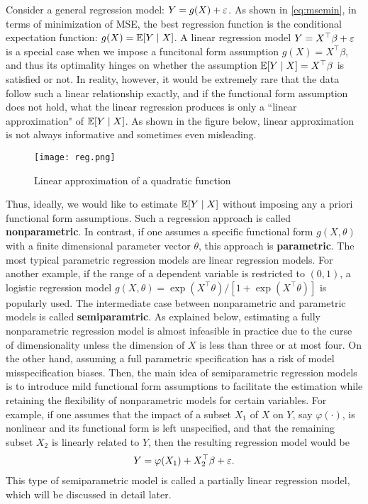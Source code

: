 \documentclass[11pt, A4paper, openany, uplatex]{book}
\begin{document}
Consider a general regression model: $Y = g(X) + \varepsilon$.
As shown in \eqref{eq:msemin}, in terms of minimization of MSE, the best regression function is the conditional expectation function: $g(X) = \mathbb{E}[Y \mid X]$.
A linear regression model $Y = X^\top\beta + \varepsilon$ is a special case when we impose a funcitonal form  assumption $g(X) = X^\top \beta$, and thus its optimality hinges on whether the assumption $\mathbb{E}[Y \mid X] = X^\top\beta$ is satisfied or not.
In reality, however, it would be extremely rare that the data follow such a linear relationship exactly, and if the functional form assumption does not hold, what the linear regression produces is only a ``linear approximation" of $\mathbb{E}[Y \mid X]$.
As shown in the figure below, linear approximation is not always informative and sometimes even misleading.

\begin{figure}[h!]
	\begin{center}
		\texttt{[image: reg.png]}
		\caption{Linear approximation of a quadratic function}
	\end{center}
\end{figure}


Thus, ideally, we would like to estimate $\mathbb{E} [Y \mid X]$ without imposing any a priori functional form assumptions.
Such a regression approach is called \textbf{nonparametric}.
In contrast, if one assumes a specific functional form $g(X, \theta)$ with a finite dimensional parameter vector $\theta$, this approach is \textbf{parametric}.
The most typical parametric regression models are linear regression models.
For another example, if the range of a dependent variable is restricted to $(0,1)$, a logistic regression model $g(X, \theta) = \exp(X^\top \theta)/[1 + \exp(X^\top \theta)]$ is popularly used. 
The intermediate case between nonparametric and parametric models is called \textbf{semiparamtric}.
As explained below, estimating a fully nonparametric regression model is almost infeasible in practice due to the curse of dimensionality unless the dimension of $X$ is less than three or at most four.
On the other hand, assuming a full parametric specification has a risk of model misspecification biases.
Then, the main idea of semiparametric regression models is to introduce mild functional form assumptions to facilitate the estimation while retaining the flexibility of nonparametric models for certain variables.
For example, if one assumes that the impact of a subset $X_1$ of $X$ on $Y$, say $\varphi(\cdot)$, is nonlinear and its functional form is left unspecified, and that the remaining subset $X_2$ is linearly related to $Y$, then the resulting regression model would be 
\begin{align*}
	Y = \varphi(X_1) + X_2^\top\beta + \varepsilon.
\end{align*}
This type of semiparametric model is called a partially linear regression model, which will be discussed in detail later.
\end{document}
